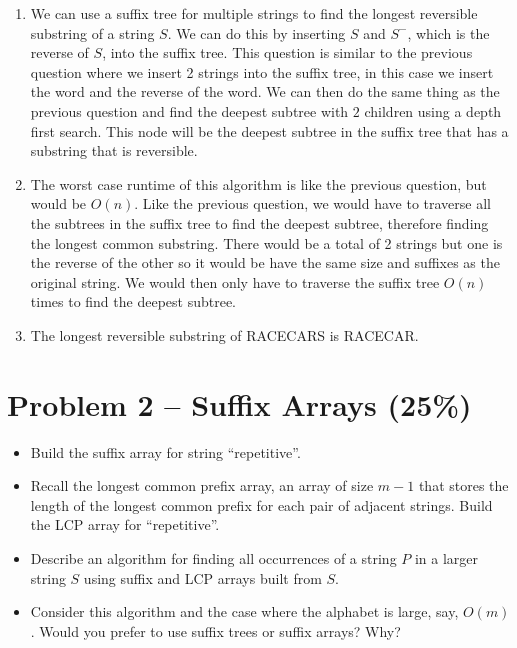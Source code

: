\documentclass[12pt,letterpaper]{article}
\begin{document}
\begin{enumerate}
    \item We can use a suffix tree for multiple strings to find the longest reversible substring of a string $S$.
    We can do this by inserting $S$ and $S^-$, which is the reverse of $S$, into the suffix tree. 
    This question is similar to the previous question where we insert 2 strings into the suffix tree, in this case we insert the word and the reverse of the word.
    We can then do the same thing as the previous question and find the deepest subtree with $2$ children using a depth first search.
    This node will be the deepest subtree in the suffix tree that has a substring that is reversible.
    \item The worst case runtime of this algorithm is like the previous question, but would be $O(n)$.
    Like the previous question, we would have to traverse all the subtrees in the suffix tree to find the deepest subtree, therefore finding the longest common substring.
    There would be a total of 2 strings but one is the reverse of the other so it would be have the same size and suffixes as the original string.
    We would then only have to traverse the suffix tree $O(n)$ times to find the deepest subtree.
    \item The longest reversible substring of RACECARS is RACECAR.

\end{enumerate}

\section*{Problem 2 -- Suffix Arrays (25\%)}
\begin{itemize}
    \item Build the suffix array for string ``repetitive''.
    \item Recall the longest common prefix array, an array of size $m-1$ that stores the length of the longest common prefix for each pair of adjacent strings. 
Build the LCP array for ``repetitive''.
    \item Describe an algorithm for finding all occurrences of a string $P$ in a larger string $S$ using
    suffix and LCP arrays built from $S$.
    \item Consider this algorithm and the case where the alphabet is large, say, $O(m)$. Would you prefer to use suffix trees or suffix arrays? Why?
\end{itemize}
\end{document}
